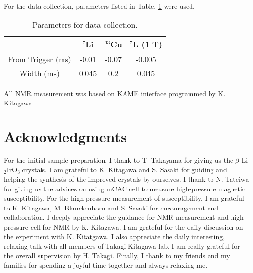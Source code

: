 \documentclass[a4,10.5pt]{report}
\begin{document}
For the data collection, parameters listed in Table. \ref{trig} were used.
\begin{table}
\begin{center}
\caption{Parameters for data collection.}
\begin{tabular}{cccc} \hline
                  & ${}^7$Li& ${}^{63}$Cu& ${}^7$L (1 T)\\ \hline
 From Trigger (ms)& -0.01& -0.07& -0.005\\ \hline
 Width (ms)& 0.045& 0.2& 0.045\\ \hline
\end{tabular}
\label{trig}
\end{center}
\end{table}

All NMR measurement was based on KAME interface programmed by K. Kitagawa.


\newpage
\chapter*{Acknowledgments}
For the initial sample preparation, I thank to T. Takayama for giving us the $\beta$-Li$_2$IrO$_3$ crystals.
I am grateful to K. Kitagawa and S. Sasaki for guiding and helping the synthesis of the improved crystals by ourselves.
I thank to N. Tateiwa for giving us the advices on using mCAC cell to measure high-pressure magnetic susceptibility.
For the high-pressure measurement of susceptibility, I am grateful to K. Kitagawa, M. Blanckenhorn and S. Sasaki for encouragement and collaboration. 
I deeply appreciate the guidance for NMR measurement and high-pressure cell for NMR by K. Kitagawa.
I am grateful for the daily discussion on the experiment with K. Kitatgawa.
I also appreciate the daily interesting, relaxing talk with all members of Takagi-Kitagawa lab. 
I am really grateful for the overall supervision by H. Takagi. 
Finally, I thank to my friends and my families for spending a joyful time together and always relaxing me.


\printbibliography[title=Reference]
\end{document}

